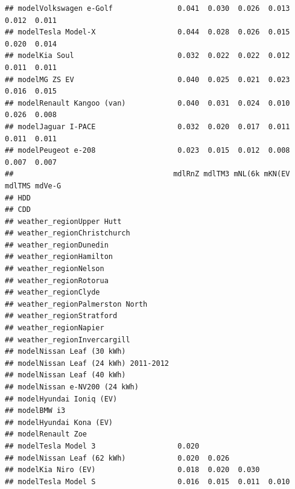 \documentclass[
]{article}
\begin{document}
\begin{verbatim}
## modelVolkswagen e-Golf               0.041  0.030  0.026  0.013  0.012  0.011
## modelTesla Model-X                   0.044  0.028  0.026  0.015  0.020  0.014
## modelKia Soul                        0.032  0.022  0.022  0.012  0.011  0.011
## modelMG ZS EV                        0.040  0.025  0.021  0.023  0.016  0.015
## modelRenault Kangoo (van)            0.040  0.031  0.024  0.010  0.026  0.008
## modelJaguar I-PACE                   0.032  0.020  0.017  0.011  0.011  0.011
## modelPeugeot e-208                   0.023  0.015  0.012  0.008  0.007  0.007
##                                     mdlRnZ mdlTM3 mNL(6k mKN(EV mdlTMS mdVe-G
## HDD                                                                          
## CDD                                                                          
## weather_regionUpper Hutt                                                     
## weather_regionChristchurch                                                   
## weather_regionDunedin                                                        
## weather_regionHamilton                                                       
## weather_regionNelson                                                         
## weather_regionRotorua                                                        
## weather_regionClyde                                                          
## weather_regionPalmerston North                                               
## weather_regionStratford                                                      
## weather_regionNapier                                                         
## weather_regionInvercargill                                                   
## modelNissan Leaf (30 kWh)                                                    
## modelNissan Leaf (24 kWh) 2011-2012                                          
## modelNissan Leaf (40 kWh)                                                    
## modelNissan e-NV200 (24 kWh)                                                 
## modelHyundai Ioniq (EV)                                                      
## modelBMW i3                                                                  
## modelHyundai Kona (EV)                                                       
## modelRenault Zoe                                                             
## modelTesla Model 3                   0.020                                   
## modelNissan Leaf (62 kWh)            0.020  0.026                            
## modelKia Niro (EV)                   0.018  0.020  0.030                     
## modelTesla Model S                   0.016  0.015  0.011  0.010              

\end{verbatim}
\end{document}
